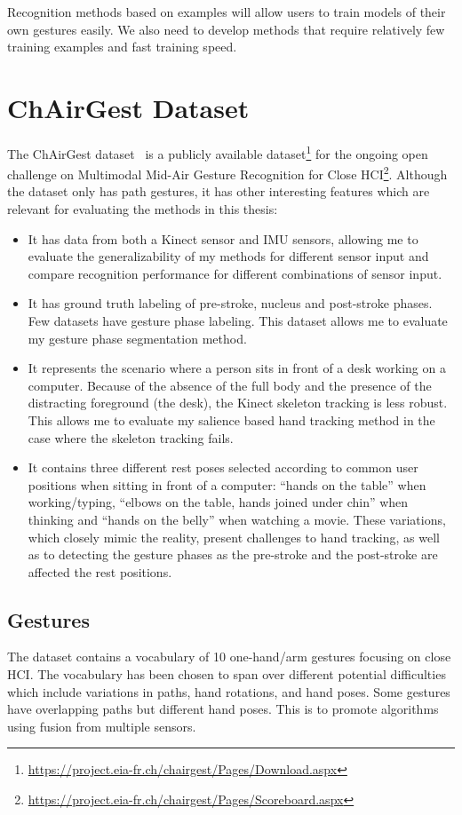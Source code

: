 Recognition methods based on examples will allow users to train models of their
own gestures easily. We also need to develop methods that
require relatively few training examples and fast training speed.

\section{ChAirGest Dataset}
The ChAirGest dataset~\cite{Ruffieux2013} is a publicly available
dataset\footnote{\url{https://project.eia-fr.ch/chairgest/Pages/Download.aspx}}
for the ongoing open challenge on Multimodal Mid-Air Gesture Recognition for
Close
HCI\footnote{\url{https://project.eia-fr.ch/chairgest/Pages/Scoreboard.aspx}}.
Although the dataset only has path gestures, it has other interesting features
which are relevant for evaluating the methods in this thesis:
\begin{itemize}
  \item It has data from both a Kinect sensor and IMU sensors, allowing me to
  evaluate the generalizability of my methods for different sensor input and
  compare recognition performance for different combinations of sensor input. 
  \item It has ground truth labeling of
  pre-stroke, nucleus and post-stroke phases. Few datasets have gesture phase
  labeling. This dataset allows me to evaluate my gesture phase segmentation method.
  \item It represents the scenario where a person sits in front of a
  desk working on a computer. Because of the absence of the full body and the
  presence of the distracting foreground (the desk), the Kinect skeleton
  tracking is less robust. This allows me to evaluate my salience based hand
  tracking method in the case where the skeleton tracking fails.
  \item It contains three different rest poses selected according to common user
  positions when sitting in front of a computer: ``hands on the table'' when
  working/typing, ``elbows on the table, hands joined under chin'' when thinking
  and ``hands on the belly'' when watching a movie. These variations, which
  closely mimic the reality, present challenges to hand tracking, as well as to
  detecting the gesture phases as the pre-stroke and the post-stroke are
  affected the rest positions.
\end{itemize}

\subsection{Gestures}
The dataset contains a vocabulary of 10 one-hand/arm gestures focusing on close
HCI. The vocabulary has been chosen to span over different potential
difficulties which include variations in paths, hand rotations, and hand poses.
Some gestures have overlapping paths but different hand poses. This is
to promote algorithms using fusion from multiple sensors.

